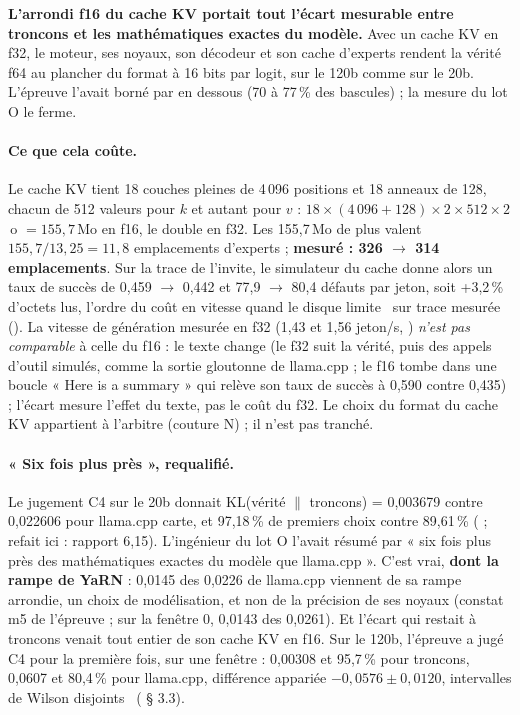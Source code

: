 \begin{enbref}[title={Ce que cela établit}]
\textbf{L'arrondi f16 du cache KV portait tout l'écart mesurable entre troncons et les mathématiques exactes du modèle.} Avec un cache KV en f32, le moteur, ses noyaux, son décodeur et son cache d'experts rendent la vérité f64 au plancher du format à 16 bits par logit, sur le 120b comme sur le 20b. L'épreuve l'avait borné par en dessous (70 à 77\,\% des bascules) ; la mesure du lot O le ferme.
\end{enbref}

\paragraph{Ce que cela coûte.} Le cache KV tient 18 couches pleines de 4\,096 positions et 18 anneaux de 128, chacun de 512 valeurs pour $k$ et autant pour $v$ : $18 \times (4\,096 + 128) \times 2 \times 512 \times 2$\,o $= 155{,}7$\,Mo en f16, le double en f32. Les 155,7\,Mo de plus valent $155{,}7/13{,}25 = 11{,}8$ emplacements d'experts \calc ; \textbf{mesuré : 326 $\to$ 314 emplacements}. Sur la trace de l'invite, le simulateur du cache donne alors un taux de succès de 0,459 $\to$ 0,442 et 77,9 $\to$ 80,4 défauts par jeton, soit +3,2\,\% d'octets lus, l'ordre du coût en vitesse quand le disque limite \calc~sur trace mesurée (). La vitesse de génération mesurée en f32 (1,43 et 1,56 jeton/s, ) \emph{n'est pas comparable} à celle du f16 : le texte change (le f32 suit la vérité, puis des appels d'outil simulés, comme la sortie gloutonne de llama.cpp ; le f16 tombe dans une boucle « Here is a summary » qui relève son taux de succès à 0,590 contre 0,435) ; l'écart mesure l'effet du texte, pas le coût du f32. Le choix du format du cache KV appartient à l'arbitre (couture N) ; il n'est pas tranché.

\paragraph{« Six fois plus près », requalifié.} Le jugement C4 sur le 20b donnait KL(vérité $\|$ troncons) = 0,003679 contre 0,022606 pour llama.cpp carte, et 97,18\,\% de premiers choix contre 89,61\,\% ( ; refait ici : rapport 6,15). L'ingénieur du lot O l'avait résumé par « six fois plus près des mathématiques exactes du modèle que llama.cpp ». C'est vrai, \textbf{dont la rampe de YaRN} : 0,0145 des 0,0226 de llama.cpp viennent de sa rampe arrondie, un choix de modélisation, et non de la précision de ses noyaux (constat m5 de l'épreuve ; sur la fenêtre 0, 0,0143 des 0,0261). Et l'écart qui restait à troncons venait tout entier de son cache KV en f16. Sur le 120b, l'épreuve a jugé C4 pour la première fois, sur une fenêtre : 0,00308 et 95,7\,\% pour troncons, 0,0607 et 80,4\,\% pour llama.cpp, différence appariée $-0{,}0576 \pm 0{,}0120$, intervalles de Wilson disjoints \mes~( § 3.3).

